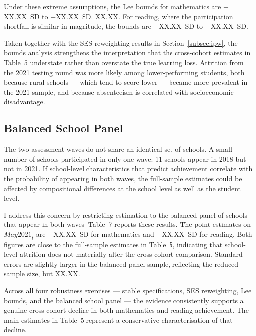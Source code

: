 Under these extreme assumptions, the Lee bounds for mathematics are
$-$XX.XX~SD to $-$XX.XX~SD. %
XX.XX. %
For reading, where the participation shortfall is similar in magnitude,
the bounds are $-$XX.XX~SD to $-$XX.XX~SD. %

Taken together with the SES reweighting results in
Section~\ref{subsec:ipw}, the bounds analysis strengthens the
interpretation that the cross-cohort estimates in Table~5 understate
rather than overstate the true learning loss. Attrition from the 2021
testing round was more likely among lower-performing students, both
because rural schools --- which tend to score lower --- became more
prevalent in the 2021 sample, and because absenteeism is correlated
with socioeconomic disadvantage.

\subsection{Balanced School Panel}
\label{subsec:balanced}

The two assessment waves do not share an identical set of schools. A small
number of schools participated in only one wave: 11 schools appear in
2018 but not in 2021. If school-level characteristics that predict
achievement correlate with the probability of appearing in both waves,
the full-sample estimates could be affected by compositional differences
at the school level as well as the student level.

I address this concern by restricting estimation to the balanced panel of
schools that appear in both waves. Table~7 reports these results.
The point estimates on $\mathit{May2021}_t$ are $-$XX.XX~SD for
mathematics and $-$XX.XX~SD for reading. %
Both figures are close to the full-sample estimates in Table~5, indicating
that school-level attrition does not materially alter the cross-cohort
comparison. Standard errors are slightly larger in the balanced-panel
sample, reflecting the reduced sample size, but XX.XX. %

Across all four robustness exercises --- stable specifications, SES
reweighting, Lee bounds, and the balanced school panel --- the evidence
consistently supports a genuine cross-cohort decline in both mathematics
and reading achievement. The main estimates in Table~5 represent a
conservative characterisation of that decline.
